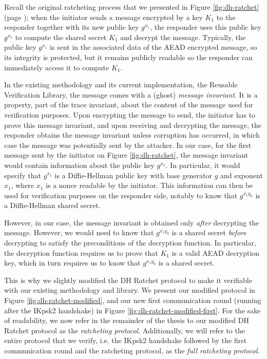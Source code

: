 Recall the original ratcheting process that we presented in Figure \ref{fig:dh-ratchet} (page \pageref{fig:dh-ratchet}); when the initiator sends a message encrypted by a key $K_1$ to the responder together with its new public key $g^{x_1}$, the responder uses this public key $g^{x_1}$ to compute the shared secret $K_1$ and decrypt the message.
Typically, the public key $g^{x_1}$ is sent in the associated data of the AEAD encrypted message, so its integrity is protected, but it remains publicly readable so the responder can immediately access it to compute $K_1$.

In the existing methodology and its current implementation, the Reusable Verification Library, the message comes with a (ghost) \emph{message invariant}. It is a property, part of the trace invariant, about the content of the message used for verification purposes. Upon encrypting the message to send, the initiator has to prove this message invariant, and upon receiving and decrypting the message, the responder obtains the message invariant unless corruption has occurred, in which case the message was potentially sent by the attacker.
In our case, for the first message sent by the initiator on Figure \ref{fig:dh-ratchet}, the message invariant would contain information about the public key $g^{x_1}$. In particular, it would specify that $g^{x_1}$ is a Diffie-Hellman public key with base generator $g$ and exponent $x_1$, where $x_1$ is a nonce readable by the initiator.
This information can then be used for verification purposes on the responder side, notably to know that $g^{x_1y_0}$ is a Diffie-Hellman shared secret.

However, in our case, the message invariant is obtained only \emph{after} decrypting the message.
However, we would need to know that $g^{x_1y_0}$ is a shared secret \emph{before} decrypting to satisfy the preconditions of the decryption function.
In particular, the decryption function requires us to prove that $K_1$ is a valid AEAD decryption key, which in turn requires us to know that $g^{x_1y_0}$ is a shared secret.

This is why we slightly modified the DH Ratchet protocol to make it verifiable with our existing methodology and library.
We present our modified protocol in Figure \ref{fig:dh-ratchet-modified}, and our new first communication round (running after the IKpsk2 handshake) in Figure \ref{fig:dh-ratchet-modified-first}.
For the sake of readability, we now refer in the remainder of the thesis to our modified DH Ratchet protocol as the \emph{ratcheting protocol}. Additionally, we will refer to the entire protocol that we verify, i.e. the IKpsk2 handshake followed by the first communication round and the ratcheting protocol, as the \emph{full ratcheting protocol}.

